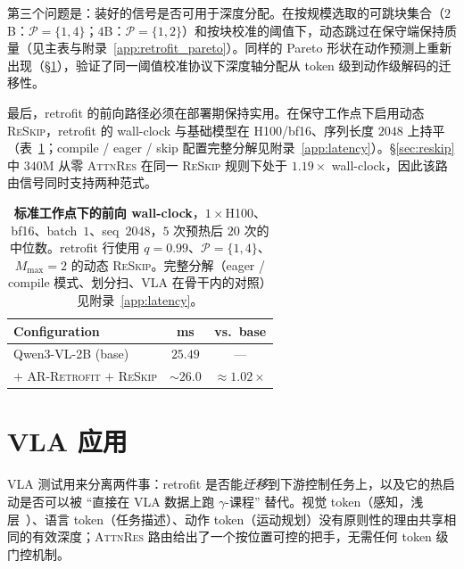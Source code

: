 \documentclass{article}
\newcommand{\attnres}{\textsc{AttnRes}}
\newcommand{\reskip}{\textsc{ReSkip}}
\newcommand{\retrofit}{\textsc{AR-Retrofit}}
\begin{document}
第三个问题是：装好的信号是否可用于深度分配。在按规模选取的可跳块集合（$2$B：$\mathcal{P}{=}\{1,4\}$；$4$B：$\mathcal{P}{=}\{1,2\}$）和按块校准的阈值下，动态跳过在保守端保持质量（见主表与附录~\ref{app:retrofit_pareto}）。同样的 Pareto 形状在动作预测上重新出现（\S\ref{sec:vla}），验证了同一阈值校准协议下深度轴分配从 token 级到动作级解码的迁移性。

最后，retrofit 的前向路径必须在部署期保持实用。在保守工作点下启用动态 \reskip{}，retrofit 的 wall-clock 与基础模型在 H100/bf16、序列长度 $2048$ 上持平（表~\ref{tab:retrofit_latency}；compile / eager / skip 配置完整分解见附录~\ref{app:latency}）。\S\ref{sec:reskip} 中 $340$M 从零 \attnres{} 在同一 \reskip{} 规则下处于 $1.19\times$ wall-clock，因此该路由信号同时支持两种范式。

\begin{table}[t]
\caption{\textbf{标准工作点下的前向 wall-clock}，$1{\times}$H100、bf16、batch~$1$、seq~$2048$，$5$ 次预热后 $20$ 次的中位数。retrofit 行使用 $q{=}0.99$、$\mathcal{P}{=}\{1,4\}$、$M_{\max}{=}2$ 的动态 \reskip{}。完整分解（eager / compile 模式、划分扫、VLA 在骨干内的对照）见附录~\ref{app:latency}。}
\label{tab:retrofit_latency}
\centering\small
\setlength{\tabcolsep}{4pt}
\begin{tabular}{lcc}
\toprule
Configuration & ms & vs.\ base \\
\midrule
Qwen3-VL-2B (base)                          & $25.49$ & --- \\
$+$ \retrofit{} $+$ \reskip{}               & $\sim 26.0$ & $\approx 1.02\times$ \\
\bottomrule
\end{tabular}
\end{table}

\section{VLA 应用}
\label{sec:vla}

VLA 测试用来分离两件事：retrofit 是否能\emph{迁移}到下游控制任务上，以及它的热启动是否可以被 ``直接在 VLA 数据上跑 $\gamma$-课程'' 替代。视觉 token（感知，浅层~\citep{raghu2021vision}）、语言 token（任务描述）、动作 token（运动规划）没有原则性的理由共享相同的有效深度；\attnres{} 路由给出了一个按位置可控的把手，无需任何 token 级门控机制。
\end{document}
